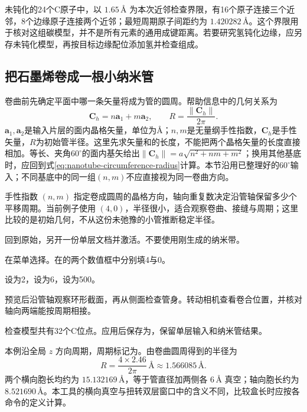 未钝化的24个C原子中，以 $1.65\,\text{\AA}$ 为本次近邻检查界限，有16个原子连接三个近邻，8个边缘原子连接两个近邻；最短周期原子间距约为 $1.420282\,\text{\AA}$。这个界限用于核对这组碳模型，并不是所有元素的通用成键距离。若要研究氢钝化边缘，应另存未钝化模型，再按目标边缘配位添加氢并检查组成。

\subsection{把石墨烯卷成一根小纳米管}

卷曲前先确定平面中哪一条矢量将成为管的圆周。帮助信息中的几何关系为
\begin{equation}
  \mathbf C_h=n\mathbf a_1+m\mathbf a_2,
  \qquad R=\frac{\|\mathbf C_h\|}{2\pi}.
  \label{eq:nanotube-circumference-radius}
\end{equation}
$\mathbf a_1,\mathbf a_2$是输入片层的面内晶格矢量，单位为\AA；$n,m$是无量纲手性指数，$\mathbf C_h$是手性矢量，$R$为初始管半径。这里先求矢量和的长度，不能把两个晶格矢量的长度直接相加。等长、夹角$60^\circ$的面内基矢给出$\|\mathbf C_h\|=a\sqrt{n^2+nm+m^2}$；换用其他基底时，应回到式\eqref{eq:nanotube-circumference-radius}计算。本节沿用已整理好的$60^\circ$输入；不同基底中的同一组$(n,m)$不应直接视为同一卷曲方向。



手性指数 $(n,m)$ 指定卷成圆周的晶格方向，轴向重复数决定沿管轴保留多少个平移周期。当前例子使用 $(4,0)$，半径很小，适合观察卷曲、接缝与周期；这里比较的是初始几何，不从这份未弛豫的小管推断稳定半径。

\begin{steps}
  \item 回到原始，另开一份单层文档并激活。不要使用刚生成的纳米带。
  \item 在菜单选择。在的两个数值框中分别填4与0。
  \item {}设为2，设为6，设为500。
  \item 预览后沿管轴观察环形截面，再从侧面检查管身。转动相机查看卷合位置，并核对轴向两端能按周期相接。
  \item 检查模型共有32个C位点。应用后保存为，保留单层输入和纳米管结果。
\end{steps}

本例沿全局 $z$ 方向周期，周期标记为。由卷曲圆周得到的半径为
\[
 R=\frac{4\times2.46}{2\pi}\,\text{\AA}\approx1.566085\,\text{\AA}.
\]
两个横向胞长均约为 $15.132169\,\text{\AA}$，等于管直径加两侧各 $6\,\text{\AA}$ 真空；轴向胞长约为 $8.521690\,\text{\AA}$。本工具的横向真空与扭转双层窗口中的含义不同，比较盒长时应按各命令的定义计算。

